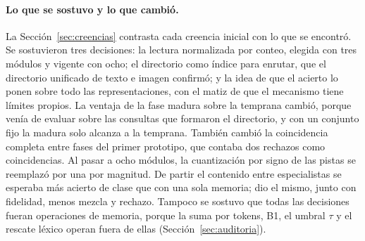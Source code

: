 \paragraph{Lo que se sostuvo y lo que cambió.}
La Sección~\ref{sec:creencias} contrasta cada creencia inicial con lo que se encontró.
Se sostuvieron tres decisiones: la lectura normalizada por conteo, elegida con tres
módulos y vigente con ocho; el directorio como índice para enrutar, que el directorio
unificado de texto e imagen confirmó; y la idea de que el acierto lo ponen sobre todo las
representaciones, con el matiz de que el mecanismo tiene límites propios.
La ventaja de la fase madura sobre la temprana cambió, porque venía de evaluar sobre las
consultas que formaron el directorio, y con un conjunto fijo la madura solo alcanza a la
temprana.
También cambió la coincidencia completa entre fases del primer prototipo, que contaba
dos rechazos como coincidencias.
Al pasar a ocho módulos, la cuantización por signo de las pistas se reemplazó por una por
magnitud.
De partir el contenido entre especialistas se esperaba más acierto de clase que con una
sola memoria; dio el mismo, junto con fidelidad, menos mezcla y rechazo.
Tampoco se sostuvo que todas las decisiones fueran operaciones de memoria, porque la suma
por tokens, B1, el umbral $\tau$ y el rescate léxico operan fuera de ellas
(Sección~\ref{sec:auditoria}).

